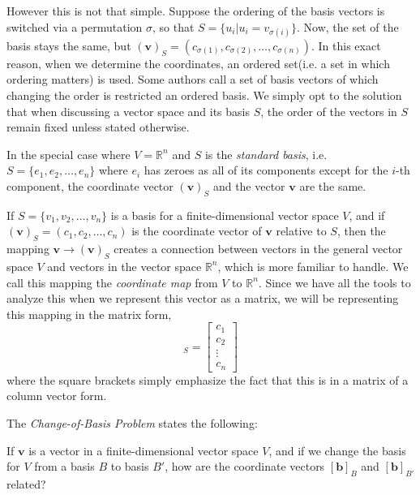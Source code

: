 \documentclass{report}
\begin{document}
	However this is not that simple. Suppose the ordering of the basis vectors is switched via a permutation $\sigma$, so that $S=\{u_i|u_i=v_{\sigma(i)}\}$. Now, the set of the basis stays the same, but $(\bm{v})_S=(c_{\sigma(1)},c_{\sigma(2)},\dots,c_{\sigma(n)})$. In this exact reason, when we determine the coordinates, an ordered set(i.e. a set in which ordering matters) is used. Some authors call a set of basis vectors of which changing the order is restricted an ordered basis. We simply opt to the solution that when discussing a vector space and its basis $S$, the order of the vectors in $S$ remain fixed unless stated otherwise.
	
	In the special case where $V=\mathbb{R}^n$ and $S$ is the \emph{standard basis}, i.e. $S=\{e_1,e_2,\dots,e_n\}$ where $e_i$ has zeroes as all of its components except for the $i$-th component, the coordinate vector $(\bm{v})_S$ and the vector $\bm{v}$ are the same.
	
	If $S=\{v_1,v_2,\dots,v_n\}$ is a basis for a finite-dimensional vector space $V$, and if $(\bm{v})_S=(c_1,c_2,\dots,c_n)$ is the coordinate vector of $\bm{v}$ relative to $S$, then the mapping $\bm{v} \rightarrow (\bm{v})_S$ creates a connection between vectors in the general vector space $V$ and vectors in the vector space $\mathbb{R}^n$, which is more familiar to handle. We call this mapping the \emph{coordinate map} from $V$ to $\mathbb{R}^n$. Since we have all the tools to analyze this when we represent this vector as a matrix, we will be representing this mapping in the matrix form,
	\begin{displaymath}
	[\bm{v}]_S=\begin{bmatrix} c_1 \\ c_2 \\ \vdots \\ c_n \end{bmatrix}
	\end{displaymath}
	where the square brackets simply emphasize the fact that this is in a matrix of a column vector form.
	
	The \emph{Change-of-Basis Problem} states the following:
	
	If $\bm{v}$ is a vector in a finite-dimensional vector space $V$, and if we change the basis for $V$ from a basis $B$ to basis $B'$, how are the coordinate vectors $[\bm{b}]_B$ and $[\bm{b}]_{B'}$ related?
	
\end{document}
